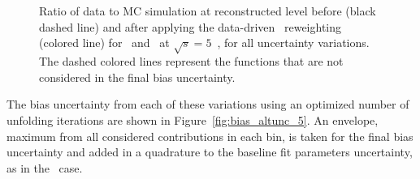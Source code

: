 \begin{figure}[h]
\centering
{}
\\
\\
\caption{Ratio of data to MC simulation at reconstructed level before (black dashed line) and after applying the data-driven \pt\ reweighting (colored line) for \ptll\ and \ut\ at $\sqrt{s} = 5$~\TeV, for all uncertainty variations. The dashed colored lines represent the functions that are not considered in the final bias uncertainty.}
\label{fig:fit_datamc_altunc_5_1GeV}
\end{figure}


The bias uncertainty from each of these variations using an optimized number of unfolding iterations are shown in Figure~\ref{fig:bias_altunc_5}.
An envelope, maximum from all considered contributions in each bin, is taken for the final bias uncertainty and added in a quadrature to the baseline fit parameters uncertainty, as in the \Wboson\ case.


